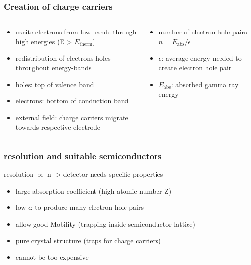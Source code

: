 \documentclass[aspectratio=1610, 9pt]{beamer}
\begin{document}
\begin{frame}\frametitle{Creation of charge carriers}
  \begin{columns}
    \begin{column}[c]{0.48\textwidth}
      \begin{itemize}
        \item excite electrons from low bands through high energies (E > $E_\text{therm}$)
        \item redistribution of electrons-holes throughout energy-bands
        \item holes: top of valence band
        \item electrons: bottom of conduction band
        \item external field: charge carriers migrate towards respective electrode
      \end{itemize}
    \end{column}
    \begin{column}[c]{0.48\textwidth}
      \begin{itemize}
        \item number of electron-hole pairs $n = E_\text{abs} / \epsilon$
        \item $\epsilon$: average energy needed to create electron hole pair
        \item $E_\text{abs}$: absorbed gamma ray energy
      \end{itemize}
    \end{column}
  \end{columns}
\end{frame}

\begin{frame}\frametitle{resolution and suitable semiconductors}
resolution $\propto$ n -> detector needs specific properties
  \begin{itemize}
    \item large absorption coefficient (high atomic number Z)
    \item low $\epsilon$: to produce many electron-hole pairs
    \item allow good Mobility (trapping inside semiconductor lattice)
    \item pure crystal structure (traps for charge carriers)
    \item cannot be too expensive
  \end{itemize}
\end{frame}
\end{document}
